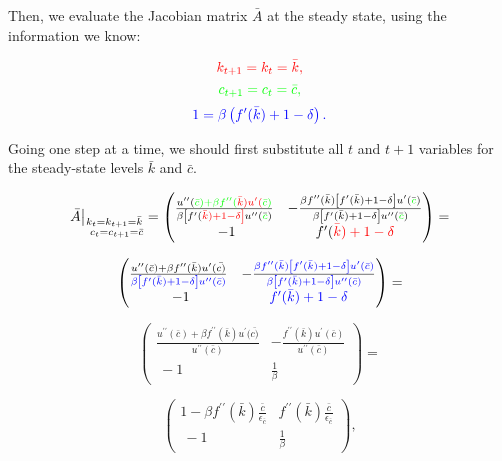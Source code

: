 \documentclass[11pt,a4paper,english]{article}
\begin{document}
Then, we evaluate the Jacobian matrix \(\bar{A}\) at the steady state,
using the information we know:

\[\color{red}{k_{t+1} = k_{t} = \bar{k},} \]
\[\color{green}{c_{t+1} = c_{t} = \bar{c},} \]
\[\color{blue}{1 = \beta \left( f^{\prime}(\bar{k}) + 1 - \delta \right).}  \]

Going one step at a time, we should first substitute all \(t\) and
\(t+1\) variables for the steady-state levels \(\bar{k}\) and
\(\bar{c}\).

\[\bar{A}\bigr\rvert_{\substack{
    k_{t} = k_{t+1} = \bar{k} \\\
     c_{t} = c_{t+1} = \bar{c}
}
}
   = \begin{pmatrix}
\frac{
    u^{\prime \prime}(\color{green}{\bar{c}})+\beta f^{\prime \prime}(\color{red}{\bar{k}})u^{\prime}(\color{green}{\bar{c})}
}
{
\beta \left[ f^{\prime}(\color{red}{\bar{k}}) + 1 - \delta \right] u^{\prime \prime}(\bar{\color{green}{c}})
}
&
 -\frac{
\beta f^{\prime \prime}(\bar{k}) \left[ f^{\prime}(\bar{k}) + 1 - \delta \right] u^{\prime}(\bar{\color{green}{c}})
}
{
\beta \left[ f^{\prime}(\bar{k}) + 1 - \delta \right] u^{\prime \prime}(\bar{\color{green}{c}})}
\\\
-1
& 
f^{\prime}(\color{red}{\bar{k}}) + 1 - \delta
\end{pmatrix} = \]

\[\begin{pmatrix}
\frac{
    u^{\prime \prime}(\bar{c})+\beta f^{\prime \prime}(\bar{k})u^{\prime}(\bar{c)}
}
{
\color{blue}{\beta \left[ f^{\prime}(\bar{k}) + 1 - \delta \right]} u^{\prime \prime}(\bar{c})
}
&
 -\frac{
\color{blue}{\beta} f^{\prime \prime}(\bar{k}) \color{blue}{\left[ f^{\prime}(\bar{k}) + 1 - \delta \right]} u^{\prime}(\bar{c})
}
{
\color{blue}{\beta \left[ f^{\prime}(\bar{k}) + 1 - \delta \right]} u^{\prime \prime}(\bar{c})}
\\\
-1
& 
\color{blue}{f^{\prime}(\bar{k}) + 1 - \delta}
\end{pmatrix} = \]

\[\begin{pmatrix}
\frac{
    u^{\prime \prime}(\bar{c})+\beta f^{\prime \prime}(\bar{k})u^{\prime}(\bar{c)}
}
{
u^{\prime \prime}(\bar{c})
}
&
 -\frac{
f^{\prime \prime}(\bar{k}) u^{\prime}(\bar{c})
}
{
u^{\prime \prime}(\bar{c})}
\\\
-1
& 
\frac{1}{\beta}
\end{pmatrix} = \]

\[\begin{pmatrix}
    1 - \beta f^{\prime \prime}(\bar{k}) \frac{\bar{c}}{\epsilon_{\bar{c}}}
&
f^{\prime \prime}(\bar{k}) \frac{\bar{c}}{\epsilon_{\bar{c}}}
\\\
-1
& 
\frac{1}{\beta}
\end{pmatrix}, \]
\end{document}
